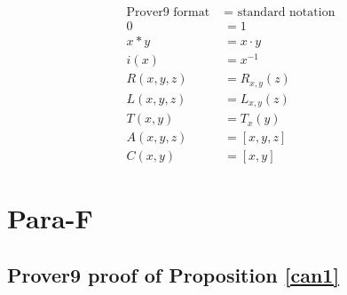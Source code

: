 \documentclass[12pt, twoside, openright]{report}
\theoremstyle{definition}
\begin{document}
\begin{align*}
  \text{Prover9 format } &= \text{ standard notation}\\
  0 &= 1\\
  x * y &= x\cdot y\\
  i(x) &= x^{-1}\\
  R(x, y, z) &= R_{x, y}(z)\\
  L(x, y, z) &= L_{x, y}(z)\\
  T(x, y) &= T_x(y)\\
  A(x, y, z) &= [x, y, z]\\
  C(x, y) &= [x, y]
\end{align*}

\section{Para-F}

\subsection{Prover9 proof of Proposition \ref{can1}}
\end{document}
